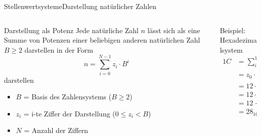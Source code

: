 \documentclass[xelatex,aspectratio=169]{beamer}
\begin{document}
\begin{frame}{Stellenwertsysteme}{Darstellung natürlicher Zahlen}
  \begin{columns}
    \begin{column}{0.5\textwidth}
      \begin{block}{Darstellung als Potenz}
        Jede natürliche Zahl \(n\) lässt sich als eine Summe von Potenzen einer beliebigen anderen natürlichen Zahl \(B \geq 2 \) darstellen in der Form
        \[
          n = \sum_{i=0}^{N-1} z_i \cdot B^i
        \]
        darstellen
        \begin{itemize}
          \item \(B\) = Basis des Zahlensystems (\(B \geq 2\))
          \item \(z_i\) = i-te Ziffer der Darstellung (\(0 \leq z_i < B\))
          \item \(N\) = Anzahl der Ziffern
        \end{itemize}
      \end{block}
    \end{column}
    \begin{column}{0.5\textwidth}
      \begin{exampleblock}{Beispiel: Hexadezimalsystem}
        \smaller
        \begin{align*}
          1C & = \sum_{i=0}^{1} z_i \cdot 16^i   \\
             & = z_0 \cdot 16^0 + z_1 \cdot 16^1 \\
             & = 12 \cdot 16^0 + 1 \cdot 16^1    \\
             & = 12 \cdot 1 + 1 \cdot 16         \\
             & = 12 + 16                         \\
             & = 28_{10}
        \end{align*}
      \end{exampleblock}
    \end{column}
  \end{columns}
\end{frame}
\end{document}
